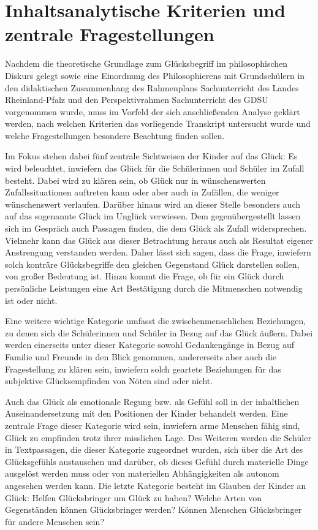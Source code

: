 \section{Inhaltsanalytische Kriterien und zentrale Fragestellungen}

Nachdem die theoretische Grundlage zum Glücksbegriff im philosophischen Diskurs gelegt sowie eine Einordnung des Philosophierens mit Grundschülern in den didaktischen Zusammenhang des Rahmenplans Sachunterricht des Landes Rheinland-Pfalz und den Perspektivrahmen Sachunterricht des GDSU vorgenommen wurde, muss im Vorfeld der sich anschließenden Analyse geklärt werden, nach welchen Kriterien das vorliegende Transkript untersucht wurde und welche Fragestellungen besondere Beachtung finden sollen.

Im Fokus stehen dabei fünf zentrale Sichtweisen der Kinder auf das Glück: 
Es wird beleuchtet, inwiefern das Glück für die Schülerinnen und Schüler im Zufall besteht. 
Dabei wird zu klären sein, ob Glück nur in wünschenswerten Zufallssituationen auftreten kann oder aber auch in Zufällen, die weniger wünschenswert verlaufen. 
Darüber hinaus wird an dieser Stelle besonders auch auf das sogenannte \glqq Glück im Unglück\grqq{} verwiesen. 
Dem gegenübergestellt lassen sich im Gespräch auch Passagen finden, die dem Glück als Zufall widersprechen. 
Vielmehr kann das Glück aus dieser Betrachtung heraus auch als Resultat eigener Anstrengung verstanden werden.
Daher lässt sich sagen, dass die Frage, inwiefern solch konträre Glücksbegriffe den gleichen Gegenstand \glqq Glück\grqq{} darstellen sollen, von großer Bedeutung ist. 
Hinzu kommt die Frage, ob für ein Glück durch persönliche Leistungen eine Art Bestätigung durch die Mitmenschen notwendig ist oder nicht.

Eine weitere wichtige Kategorie umfasst die zwischenmenschlichen Beziehungen, zu denen sich die Schülerinnen und Schüler in Bezug auf das Glück äußern. 
Dabei werden einerseits unter dieser Kategorie sowohl Gedankengänge in Bezug auf Familie und Freunde in den Blick genommen, andererseits aber auch die Fragestellung zu klären sein, inwiefern solch geartete Beziehungen für das subjektive Glücksempfinden von Nöten sind oder nicht. 

Auch das Glück als emotionale Regung bzw. als Gefühl soll in der inhaltlichen Auseinandersetzung mit den Positionen der Kinder behandelt werden. 
Eine zentrale Frage dieser Kategorie wird sein, inwiefern arme Menschen fähig sind, Glück zu empfinden trotz ihrer misslichen Lage. 
Des Weiteren werden die Schüler in Textpassagen, die dieser Kategorie zugeordnet wurden, sich über die Art des Glücksgefühls austauschen und darüber, ob dieses Gefühl durch materielle Dinge ausgelöst werden muss oder von materiellen Abhängigkeiten als autonom angesehen werden kann. 
Die letzte Kategorie besteht im Glauben der Kinder an Glück: 
Helfen Glücksbringer um Glück zu haben? Welche Arten von Gegenständen können Glücksbringer werden? 
Können Menschen Glücksbringer für andere Menschen sein?

